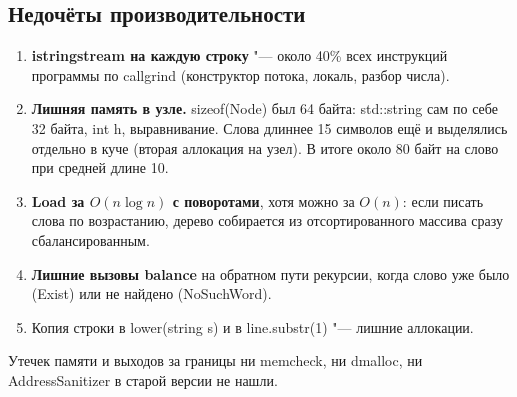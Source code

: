 \subsection{Недочёты производительности}
\begin{enumerate}
\item {\bfseries {\ttfamily istringstream} на каждую строку} "--- около 40\% всех инструкций
программы по {\ttfamily callgrind} (конструктор потока, локаль, разбор числа).
\item {\bfseries Лишняя память в узле.} {\ttfamily sizeof(Node)} был 64 байта: {\ttfamily std::string}
сам по себе 32 байта, {\ttfamily int h}, выравнивание. Слова длиннее 15 символов ещё и выделялись
отдельно в куче (вторая аллокация на узел). В итоге около 80 байт на слово при средней длине 10.
\item {\bfseries {\ttfamily Load} за $O(n \log n)$ с поворотами}, хотя можно за $O(n)$: если писать
слова по возрастанию, дерево собирается из отсортированного массива сразу сбалансированным.
\item {\bfseries Лишние вызовы {\ttfamily balance}} на обратном пути рекурсии, когда слово уже было
({\ttfamily Exist}) или не найдено ({\ttfamily NoSuchWord}).
\item Копия строки в {\ttfamily lower(string s)} и в {\ttfamily line.substr(1)} "--- лишние аллокации.
\end{enumerate}

Утечек памяти и выходов за границы ни {\ttfamily memcheck}, ни {\ttfamily dmalloc}, ни
{\ttfamily AddressSanitizer} в старой версии не нашли.
\pagebreak

